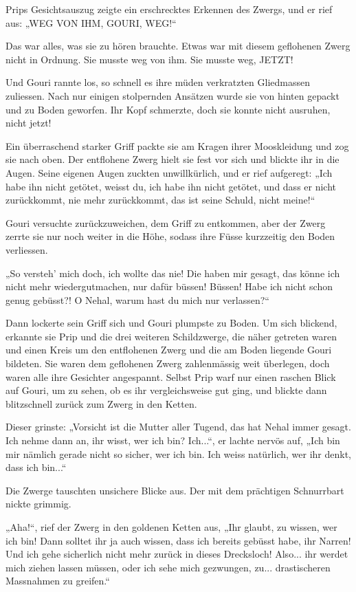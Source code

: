 Prips Gesichtsauszug zeigte ein erschrecktes Erkennen des Zwergs, und er rief aus: „WEG VON IHM, GOURI, WEG!“

Das war alles, was sie zu hören brauchte. Etwas war mit diesem geflohenen Zwerg nicht in Ordnung. Sie musste weg von ihm. Sie musste weg, JETZT!

Und Gouri rannte los, so schnell es ihre müden verkratzten Gliedmassen zuliessen. Nach nur einigen stolpernden Ansätzen wurde sie von hinten gepackt und zu Boden geworfen. Ihr Kopf schmerzte, doch sie konnte nicht ausruhen, nicht jetzt!

Ein überraschend starker Griff packte sie am Kragen ihrer Mooskleidung und zog sie nach oben. Der entflohene Zwerg hielt sie fest vor sich und blickte ihr in die Augen. Seine eigenen Augen zuckten unwillkürlich, und er rief aufgeregt: „Ich habe ihn nicht getötet, weisst du, ich habe ihn nicht getötet, und dass er nicht zurückkommt, nie mehr zurückkommt, das ist seine Schuld, nicht meine!“

Gouri versuchte zurückzuweichen, dem Griff zu entkommen, aber der Zwerg zerrte sie nur noch weiter in die Höhe, sodass ihre Füsse kurzzeitig den Boden verliessen.

„So versteh’ mich doch, ich wollte das nie! Die haben mir gesagt, das könne ich nicht mehr wiedergutmachen, nur dafür büssen! Büssen! Habe ich nicht schon genug gebüsst?! O Nehal, warum hast du mich nur verlassen?“

Dann lockerte sein Griff sich und Gouri plumpste zu Boden. Um sich blickend, erkannte sie Prip und die drei weiteren Schildzwerge, die näher getreten waren und einen Kreis um den entflohenen Zwerg und die am Boden liegende Gouri bildeten. Sie waren dem geflohenen Zwerg zahlenmässig weit überlegen, doch waren alle ihre Gesichter angespannt. Selbst Prip warf nur einen raschen Blick auf Gouri, um zu sehen, ob es ihr vergleichsweise gut ging, und blickte dann blitzschnell zurück zum Zwerg in den Ketten.

Dieser grinste: „Vorsicht ist die Mutter aller Tugend, das hat Nehal immer gesagt. Ich nehme dann an, ihr wisst, wer ich bin? Ich...“, er lachte nervös auf, „Ich bin mir nämlich gerade nicht so sicher, wer ich bin. Ich weiss natürlich, wer ihr denkt, dass ich bin...“

Die Zwerge tauschten unsichere Blicke aus. Der mit dem prächtigen Schnurrbart nickte grimmig.

„Aha!“, rief der Zwerg in den goldenen Ketten aus, „Ihr glaubt, zu wissen, wer ich bin! Dann solltet ihr ja auch wissen, dass ich bereits gebüsst habe, ihr Narren! Und ich gehe sicherlich nicht mehr zurück in dieses Drecksloch! Also... ihr werdet mich ziehen lassen müssen, oder ich sehe mich gezwungen, zu... drastischeren Massnahmen zu greifen.“

